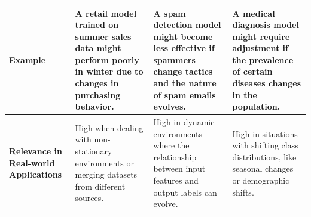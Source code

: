 \begin{longtable}{|m{3.5cm}|m{4cm}|m{4cm}|m{4cm}|}
    \textbf{Example} & A retail model trained on summer sales data might perform poorly in winter due to changes in purchasing behavior. & A spam detection model might become less effective if spammers change tactics and the nature of spam emails evolves. & A medical diagnosis model might require adjustment if the prevalence of certain diseases changes in the population. \\ \hline

    \textbf{Relevance in Real-world Applications} & High when dealing with non-stationary environments or merging datasets from different sources. & High in dynamic environments where the relationship between input features and output labels can evolve. & High in situations with shifting class distributions, like seasonal changes or demographic shifts. \\ \hline

\end{longtable}


















